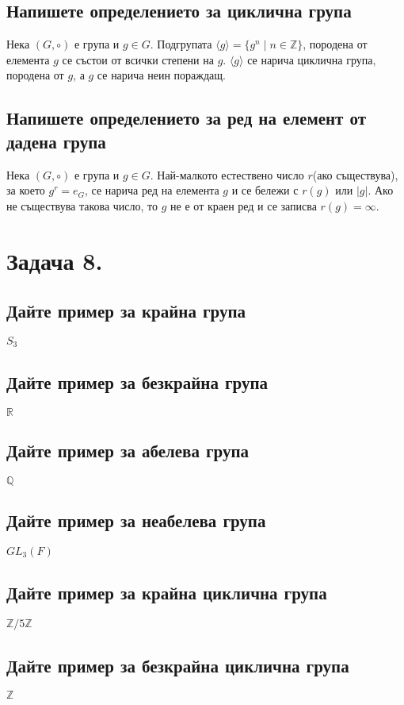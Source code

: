 \documentclass[12pt]{article}
\newcommand*{\Z}{\mathbb{Z}}
\newcommand*{\R}{\mathbb{R}}
\newcommand*{\Q}{\mathbb{Q}}
\begin{document}
\subsection*{Напишете определението за циклична група}
Нека $(G, \circ)$ е група и $g \in G$. Подгрупата $\langle g \rangle = \{g^n \mid n \in \Z\}$, породена от елемента $g$ се състои от всички степени на $g$. $\langle g \rangle$ се нарича циклична група, породена от $g$, а $g$ се нарича неин пораждащ.

\subsection*{Напишете определението за ред на елемент от дадена група}
Нека $(G, \circ)$ е група и $g \in G$. Най-малкото естествено число $r$(ако съществува), за което $g^r = e_G$, се нарича ред на елемента $g$ и се бележи с $r(g)$ или $|g|$. Ако не съществува такова число, то $g$ не е от краен ред и се записва $r(g) = \infty$.

\section*{Задача 8.}

\subsection*{Дайте пример за крайна група}
$S_3$
\subsection*{Дайте пример за безкрайна група}
$\R$

\subsection*{Дайте пример за абелева група}
$\Q$

\subsection*{Дайте пример за неабелева група}
$GL_3(F)$

\subsection*{Дайте пример за крайна циклична група}
$\Z/5\Z$

\subsection*{Дайте пример за безкрайна циклична група}
$\Z$
\end{document}
